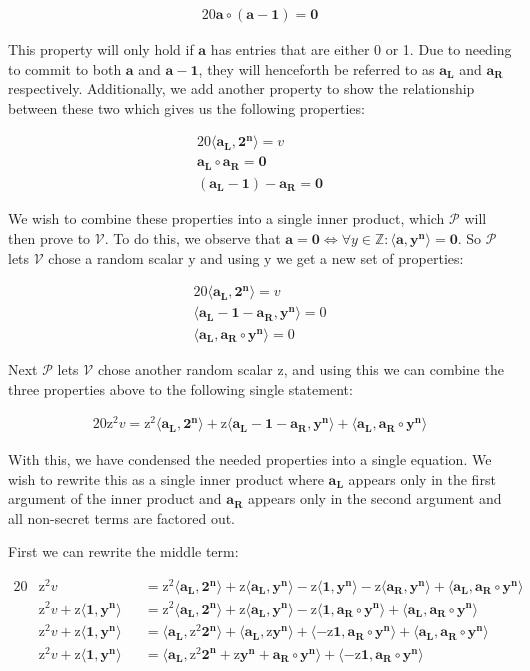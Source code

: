 \documentclass{article}
\newcommand{\eq}[1]{\begin{alignat*}{20}#1\end{alignat*}}
\renewcommand{\vec}[1]{\boldsymbol{#1}}
\newcommand{\ran}[1]{\mathrm{#1}}
\newcommand{\vecran}[1]{\mathbf{#1}}
\newcommand{\V}{\mathcal{V}}
\renewcommand{\P}{\mathcal{P}}
\newcommand{\dotp}[2]{\langle #1, #2 \rangle}
\newcommand{\opn}[1]{\operatorname{#1}}
\newcommand{\vecl}[1]{\vec{#1_{\opn{L}}}}
\newcommand{\vecr}[1]{\vec{#1_{\opn{R}}}}
\begin{document}
\eq{\vec{a} \circ (\vec{a} - \vec{1}) = \vec{0}}

This property will only hold if $\vec{a}$ has entries that are either
0 or 1. Due to needing to commit to both $\vec{a}$ and $\vec{a}
- \vec{1}$, they will henceforth be referred to as $\vecl{a}$
and $\vecr{a}$ respectively. Additionally, we add another property to show the
relationship between these two which gives us the following properties:

\eq{
	\dotp{\vecl{a}}{\vec{2^n}} = v \\
	\vecl{a}\circ \vecr{a} = \vec{0} \\
	(\vecl{a} - \vec{1}) - \vecr{a} = \vec{0}
}

We wish to combine these properties into a single inner product, which
$\P$ will then prove to $\V$. To do this, we observe that $\vec{a}
= \vec{0} \iff \forall y\in\mathbb{Z}: \dotp{\vec{a}}{\vec{y^n}} =
\vec{0}$. So $\P$ lets $\V$ chose a random scalar $\ran{y}$ and using
$\ran{y}$ we get a new set of properties:

\eq{
	\dotp{\vecl{a}}{\vec{2^n}} = v \\
	\dotp{\vecl{a} - \vec{1} - \vecr{a}}{\vecran{y}^{\vec{n}}} = 0 \\
	\dotp{\vecl{a}}{\vecr{a}\circ \vecran{y}^{\vec{n}}} = 0
}

Next $\P$ lets $\V$ chose another random scalar $\ran{z}$, and using
this we can combine the three properties above to the following single
statement:

\eq{
	\ran{z^2}v = 
	\ran{z^2}\dotp{\vecl{a}}{\vec{2^n}} +
	\ran{z}\dotp{\vecl{a} - \vec{1} - \vecr{a}}{\vecran{y}^{\vec{n}}} +
	\dotp{\vecl{a}}{\vecr{a}\circ \vecran{y}^{\vec{n}}}
}

With this, we have condensed the needed properties into a single equation. 
We wish to rewrite this as a single inner product where $\vecl{a}$ 
appears only in the first argument of the inner product and $\vecr{a}$ 
appears only in the second argument and all non-secret terms are factored 
out.

First we can rewrite the middle term:

\eq{	
	&\ran{z^2}v &&= 
	\ran{z^2}\dotp{\vecl{a}}{\vec{2^n}} +
	\ran{z}\dotp{\vecl{a}}{\vecran{y}^{\vec{n}}} -
	\ran{z}\dotp{\vec{1}}{\vecran{y}^{\vec{n}}} -
	\ran{z}\dotp{\vecr{a}}{\vecran{y}^{\vec{n}}} +
	\dotp{\vecl{a}}{\vecr{a}\circ \vecran{y}^{\vec{n}}} \\
	&\ran{z^2}v + \ran{z}\dotp{\vec{1}}{\vecran{y}^{\vec{n}}} 
	&&= \ran{z^2}\dotp{\vecl{a}}{\vec{2^n}} +
	\ran{z}\dotp{\vecl{a}}{\vecran{y}^{\vec{n}}} -
	\ran{z}\dotp{\vec{1}}{\vecr{a}\circ\vecran{y}^{\vec{n}}} +
	\dotp{\vecl{a}}{\vecr{a}\circ \vecran{y}^{\vec{n}}} \\
	&\ran{z^2}v + \ran{z}\dotp{\vec{1}}{\vecran{y}^{\vec{n}}} 
	&&= \dotp{\vecl{a}}{\ran{z^2}\vec{2^n}} +
	\dotp{\vecl{a}}{\ran{z}\vecran{y}^{\vec{n}}} +
	\dotp{-\ran{z}\vec{1}}{\vecr{a}\circ\vecran{y}^{\vec{n}}} +
	\dotp{\vecl{a}}{\vecr{a}\circ \vecran{y}^{\vec{n}}} \\
	&\ran{z^2}v + \ran{z}\dotp{\vec{1}}{\vecran{y}^{\vec{n}}} 
	&&= \dotp{\vecl{a}}{\ran{z^2}\vec{2^n} + \ran{z}\vecran{y}^{\vec{n}} + \vecr{a}\circ \vecran{y}^{\vec{n}}} +
	\dotp{-\ran{z}\vec{1}}{\vecr{a}\circ\vecran{y}^{\vec{n}}}
}
\end{document}
